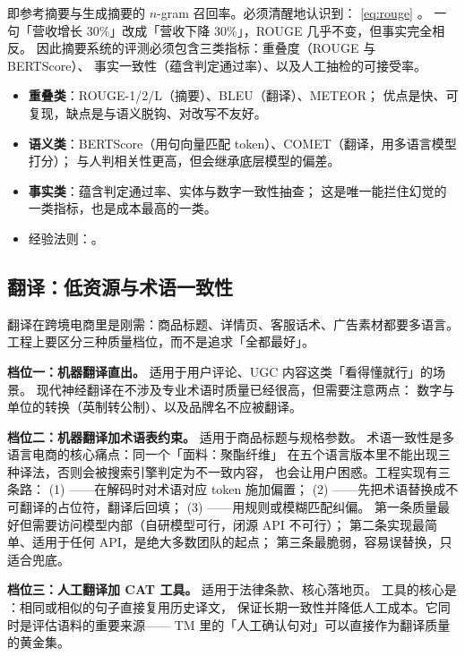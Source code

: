 即参考摘要与生成摘要的 $n$-gram 召回率。必须清醒地认识到：
\cref{eq:rouge} 。
一句「营收增长 30\%」改成「营收下降 30\%」，ROUGE 几乎不变，但事实完全相反。
因此摘要系统的评测必须包含三类指标：重叠度（ROUGE 与 BERTScore）、
事实一致性（蕴含判定通过率）、以及人工抽检的可接受率。

\begin{formulacard}[摘要与翻译的评测指标速记]
\begin{itemize}
  \item \textbf{重叠类}：ROUGE-1/2/L（摘要）、BLEU（翻译）、METEOR；
        优点是快、可复现，缺点是与语义脱钩、对改写不友好。
  \item \textbf{语义类}：BERTScore（用句向量匹配 token）、COMET（翻译，用多语言模型打分）；
        与人判相关性更高，但会继承底层模型的偏差。
  \item \textbf{事实类}：蕴含判定通过率、实体与数字一致性抽查；
        这是唯一能拦住幻觉的一类指标，也是成本最高的一类。
  \item 经验法则：。
\end{itemize}
\end{formulacard}

\subsection{翻译：低资源与术语一致性}

翻译在跨境电商里是刚需：商品标题、详情页、客服话术、广告素材都要多语言。
工程上要区分三种质量档位，而不是追求「全都最好」。

\textbf{档位一：机器翻译直出。} 适用于用户评论、UGC 内容这类「看得懂就行」的场景。
现代神经翻译在不涉及专业术语时质量已经很高，但需要注意两点：
数字与单位的转换（英制转公制）、以及品牌名不应被翻译。

\textbf{档位二：机器翻译加术语表约束。} 适用于商品标题与规格参数。
术语一致性是多语言电商的核心痛点：同一个「面料：聚酯纤维」
在五个语言版本里不能出现三种译法，否则会被搜索引擎判定为不一致内容，
也会让用户困惑。工程实现有三条路：
(1) ——在解码时对术语对应 token 施加偏置；
(2) ——先把术语替换成不可翻译的占位符，翻译后回填；
(3) ——用规则或模糊匹配纠偏。
第一条质量最好但需要访问模型内部（自研模型可行，闭源 API 不可行）；
第二条实现最简单、适用于任何 API，是绝大多数团队的起点；
第三条最脆弱，容易误替换，只适合兜底。

\textbf{档位三：人工翻译加 CAT 工具。} 适用于法律条款、核心落地页。
 工具的核心是
：相同或相似的句子直接复用历史译文，
保证长期一致性并降低人工成本。它同时是评估语料的重要来源——
TM 里的「人工确认句对」可以直接作为翻译质量的黄金集。

